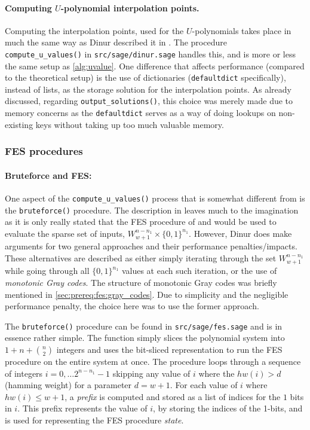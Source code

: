 \paragraph{Computing $U$-polynomial interpolation points.} Computing the interpolation points, used for the $U$-polynomials takes place in much the same way as Dinur described it in \cite{eurocrypt-2021-30841}. The procedure \texttt{compute\_u\_values()} in \texttt{src/sage/dinur.sage} handles this, and is more or less the same setup as \cref{alg:uvalue}. One difference that affects performance (compared to the theoretical setup) is the use of dictionaries (\texttt{defaultdict} specifically), instead of lists, as the storage solution for the interpolation points.
As already discussed, regarding \texttt{output\_solutions()}, this choice was merely made due to memory concerns as the \texttt{defaultdict} serves as a way of doing lookups on non-existing keys without taking up too much valuable memory.

\subsubsection{FES procedures} \label{sec:impl:fes}

\paragraph{Bruteforce and FES:} One aspect of the \texttt{compute\_u\_values()} process that is somewhat different from \cite{eurocrypt-2021-30841} is the \texttt{bruteforce()} procedure. The description in \cite{eurocrypt-2021-30841} leaves much to the imagination as it is only really stated that the FES procedure of \cite{cryptoeprint:2013/436} and \cite{ches-2010-23990} would be used to evaluate the sparse set of inputs, $W^{n - n_1}_{w + 1} \times \{0,1\}^{n_1}$. However, Dinur does make arguments for two general approaches and their performance penalties/impacts. These alternatives are described as either simply iterating through the set $W^{n - n_1}_{w + 1}$ while going through all $\{0,1\}^{n_1}$ values at each such iteration, or the use of \textit{monotonic Gray codes}. The structure of monotonic Gray codes was briefly mentioned in \cref{sec:prereq:fes:gray_codes}. Due to simplicity and the negligible performance penalty, the choice here was to use the former approach. 

The \texttt{bruteforce()} procedure can be found in \texttt{src/sage/fes.sage} and is in essence rather simple. The function simply slices the polynomial system into $1 + n + \binom{n}{2}$ integers and uses the bit-sliced representation to run the FES procedure on the entire system at once. The procedure loops through a sequence of integers $i = 0, \dots 2^{n - n_1} - 1$ skipping any value of $i$ where the $hw(i) > d$ (hamming weight) for a parameter $d = w + 1$. For each value of $i$ where $hw(i) \leq w + 1$, a \textit{prefix} is computed and stored as a list of indices for the $1$ bits in $i$.
This prefix represents the value of $i$, by storing the indices of the 1-bits, and is used for representing the FES procedure \textit{state}.

